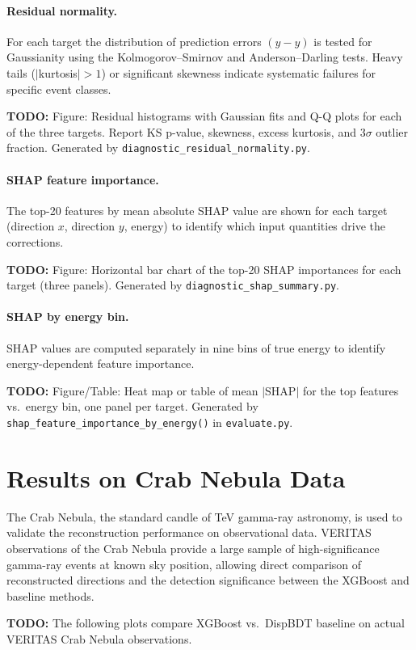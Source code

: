 \documentclass[12pt]{article}
\newcommand{\todo}[1]{\begin{hintBox} \textbf{TODO:} #1 \end{hintBox}}
\begin{document}
\paragraph{Residual normality.}
For each target the distribution of prediction errors $(y - \hat{y})$ is tested
for Gaussianity using the Kolmogorov--Smirnov and Anderson--Darling tests.
Heavy tails ($|$kurtosis$| > 1$) or significant skewness indicate systematic failures
for specific event classes.
\todo{Figure: Residual histograms with Gaussian fits and Q-Q plots for each of the three targets. Report KS p-value, skewness, excess kurtosis, and 3$\sigma$ outlier fraction. Generated by \texttt{diagnostic\_residual\_normality.py}.}

\paragraph{SHAP feature importance.}
The top-20 features by mean absolute SHAP value are shown for each target
(direction $x$, direction $y$, energy) to identify which input quantities
drive the corrections.
\todo{Figure: Horizontal bar chart of the top-20 SHAP importances for each target (three panels). Generated by \texttt{diagnostic\_shap\_summary.py}.}

\paragraph{SHAP by energy bin.}
SHAP values are computed separately in nine bins of true energy to
identify energy-dependent feature importance.
\todo{Figure/Table: Heat map or table of mean $|$SHAP$|$ for the top features vs.\ energy bin, one panel per target. Generated by \texttt{shap\_feature\_importance\_by\_energy()} in \texttt{evaluate.py}.}



\section{Results on Crab Nebula Data}
\label{sec:results}

The Crab Nebula, the standard candle of TeV gamma-ray astronomy, is used to
validate the reconstruction performance on observational data.
VERITAS observations of the Crab Nebula provide a large sample of high-significance
gamma-ray events at known sky position, allowing direct comparison of reconstructed
directions and the detection significance between the XGBoost and baseline methods.

\todo{The following plots compare XGBoost vs.\ DispBDT baseline on actual VERITAS Crab Nebula observations.}
\end{document}
